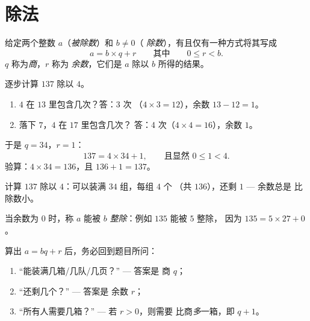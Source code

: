 \section{除法}

\begin{theorem}[带余除法]\label{thm:g6:wholes:division}
给定两个整数 $a$（\emph{被除数}）和 $b \neq 0$（
\emph{除数}），有且仅有一种方式将其写成
\[
a = b \times q + r
\qquad\text{其中}\qquad
0 \leq r < b .
\]
$q$ 称为\emph{商}，$r$ 称为
\emph{余数}，它们是 $a$ 除以 $b$ 所得的结果。
\end{theorem}
\admitted

\begin{example}\label{ex:g6:wholes:division}
逐步计算 $137$ 除以 $4$。
\begin{enumerate}
  \item $4$ 在 $13$ 里包含几次？答：3 次
        （$4 \times 3 = 12$），余数 $13 - 12 = 1$。
  \item 落下 $7$，$4$ 在 $17$ 里包含几次？
        答：4 次（$4 \times 4 = 16$），余数 $1$。
\end{enumerate}
于是 $q = 34$，$r = 1$：
\[
137 = 4 \times 34 + 1, \qquad\text{且显然 } 0 \leq 1 < 4 .
\]
验算：$4 \times 34 = 136$，且 $136 + 1 = 137$。
\end{example}

\begin{omfigure}

{\small 计算 $137$ 除以 $4$：可以装满 $34$ 组，每组 $4$ 个
（共 $136$），还剩 $1$ --- 余数总是
比除数小。}
\end{omfigure}

\begin{definition}[能被……整除]\label{def:g6:wholes:divisible}
当余数为 $0$ 时，称 $a$ 能被 $b$
\emph{整除}：例如 $135$ 能被 $5$ 整除，
因为 $135 = 5 \times 27 + 0$。
\end{definition}

\begin{method}[含除法的应用题]\label{met:g6:wholes:problems}
算出 $a = bq + r$ 后，务必回到题目所问：
\begin{enumerate}
  \item “能装满几箱/几队/几页？” --- 答案是
        商 $q$；
  \item “还剩几个？” --- 答案是
        余数 $r$；
  \item “所有人需要几箱？” --- 若 $r > 0$，则需要
        比商\emph{多}一箱，即 $q + 1$。
\end{enumerate}
\end{method}

